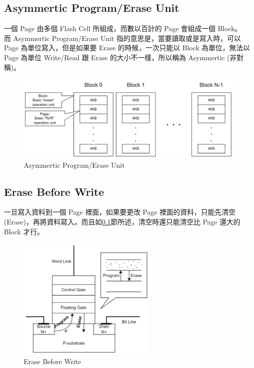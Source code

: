 \subsection{Asymmertic Program/Erase Unit}\label{s2.1.2}
\indent
一個 Page 由多個 Flash Cell 所組成，而數以百計的 Page 會組成一個 Block。\\
而 Asymmertic Program/Erase Unit 指的意思是，當要讀取或是寫入時，可以 Page 為單位寫入，但是如果要 Erase 的時候，一次只能以 Block 為單位，無法以 Page 為單位 Write/Read 跟 Erase 的大小不一樣，所以稱為 Asymmertic (非對稱)。
\begin{figure}[H]
    \centering
    \includegraphics[width=1\textwidth]{picture/ch2/Asymmertic_P-E_unit.png}
    \caption{Asymmertic Program/Erase Unit}
    \label{f2.1}
\end{figure}

\subsection{Erase Before Write}\label{s2.1.3}
\indent
一旦寫入資料到一個 Page 裡面，如果要更改 Page 裡面的資料，只能先清空(Erase)，再將資料寫入。而且如\ref{s2.1.2}節所述，清空時還只能清空比 Page 還大的 Block 才行。\cite{SRFTL}
\begin{figure}[H]
    \centering
    \includegraphics[width=0.6\textwidth]{picture/ch2/erase_before_write.png}
    \caption{Erase Before Write}
    \label{f2.2}
\end{figure}

